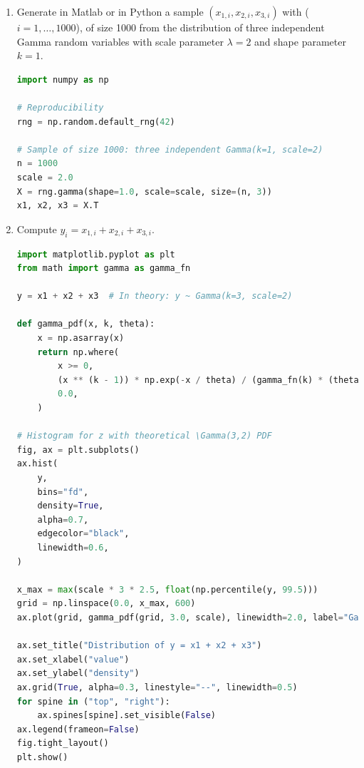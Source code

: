 \documentclass[dvipsnames,11pt]{article}
\begin{document}
    \begin{enumerate}[label=\alph*.]
        \item Generate in Matlab or in Python a sample $(x_{1,i},x_{2,i},x_{3,i})$ with ($i=1,\dots,1000$), of size 1000 from the distribution of three independent Gamma random variables with scale parameter $\lambda=2$ and shape parameter $k=1$.

            \begin{solution}

\begin{lstlisting}[language=python]
import numpy as np

# Reproducibility
rng = np.random.default_rng(42)

# Sample of size 1000: three independent Gamma(k=1, scale=2)
n = 1000
scale = 2.0
X = rng.gamma(shape=1.0, scale=scale, size=(n, 3))
x1, x2, x3 = X.T
\end{lstlisting}
       
            \end{solution}

        \item Compute $y_i=x_{1,i}+x_{2,i}+x_{3,i}$.

            \begin{solution}
    
\begin{lstlisting}[language=python]
import matplotlib.pyplot as plt
from math import gamma as gamma_fn

y = x1 + x2 + x3  # In theory: y ~ Gamma(k=3, scale=2)

def gamma_pdf(x, k, theta):
    x = np.asarray(x)
    return np.where(
        x >= 0,
        (x ** (k - 1)) * np.exp(-x / theta) / (gamma_fn(k) * (theta ** k)),
        0.0,
    )

# Histogram for z with theoretical \Gamma(3,2) PDF
fig, ax = plt.subplots()
ax.hist(
    y,
    bins="fd",
    density=True,
    alpha=0.7,
    edgecolor="black",
    linewidth=0.6,
)

x_max = max(scale * 3 * 2.5, float(np.percentile(y, 99.5)))
grid = np.linspace(0.0, x_max, 600)
ax.plot(grid, gamma_pdf(grid, 3.0, scale), linewidth=2.0, label="Gamma(k=3, scale=2) PDF")

ax.set_title("Distribution of y = x1 + x2 + x3")
ax.set_xlabel("value")
ax.set_ylabel("density")
ax.grid(True, alpha=0.3, linestyle="--", linewidth=0.5)
for spine in ("top", "right"):
    ax.spines[spine].set_visible(False)
ax.legend(frameon=False)
fig.tight_layout()
plt.show()
\end{lstlisting}


\end{solution}
\end{enumerate}
\end{document}
